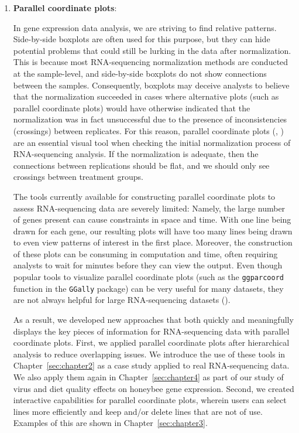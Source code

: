 \documentclass[11pt,a4paper,oldfontcommands,openany]{memoir}
\numberwithin{equation}{section} %
\newcommand{\code}[1]{{\texttt{#1}}}
\begin{document}
\begin{enumerate}
\item \textbf{Parallel coordinate plots}:

In gene expression data analysis, we are striving to find relative patterns. Side-by-side boxplots are often used for this purpose, but they can hide potential problems that could still be lurking in the data after normalization. This is because most RNA-sequencing normalization methods are conducted at the sample-level, and side-by-side boxplots do not show connections between the samples. Consequently, boxplots may deceive analysts to believe that the normalization succeeded in cases where alternative plots (such as parallel coordinate plots) would have otherwise indicated that the normalization was in fact unsuccessful due to the presence of inconsistencies (crossings) between replicates. For this reason, parallel coordinate plots (\citealt{origPCP}, \citealt{origPCP2}) are an essential visual tool when checking the initial normalization process of RNA-sequencing analysis. If the normalization is adequate, then the connections between replications should be flat, and we should only see crossings between treatment groups.

The tools currently available for constructing parallel coordinate plots to assess RNA-sequencing data are severely limited: Namely, the large number of genes present can cause constraints in space and time. With one line being drawn for each gene, our resulting plots will have too many lines being drawn to even view patterns of interest in the first place. Moreover, the construction of these plots can be consuming in computation and time, often requiring analysts to wait for minutes before they can view the output. Even though popular tools to visualize parallel coordinate plots (such as the \code{ggparcoord} function in the \code{GGally} package) can be very useful for many datasets, they are not always helpful for large RNA-sequencing datasets (\citealt{ggally}).

As a result, we developed new approaches that both quickly and meaningfully displays the key pieces of information for RNA-sequencing data with parallel coordinate plots. First, we applied parallel coordinate plots after hierarchical analysis to reduce overlapping issues. We introduce the use of these tools in Chapter~\ref{sec:chapter2} as a case study applied to real RNA-sequencing data. We also apply them again in Chapter~\ref{sec:chapter4} as part of our study of virus and diet quality effects on honeybee gene expression. Second, we created interactive capabilities for parallel coordinate plots, wherein users can select lines more efficiently and keep and/or delete lines that are not of use. Examples of this are shown in Chapter~\ref{sec:chapter3}.


\end{enumerate}
\end{document}
